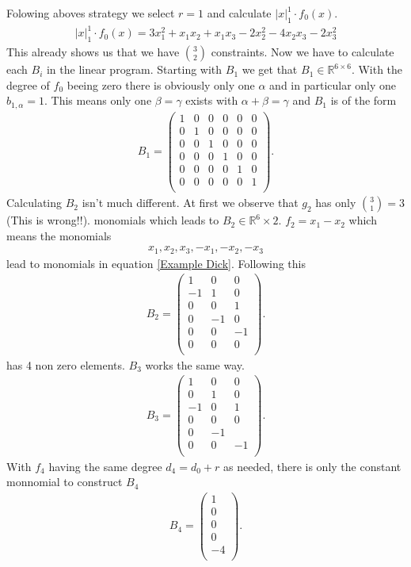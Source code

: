 \documentclass[./main.tex]{subfiles}
\begin{document}
Folowing aboves strategy we select $r=1$ and calculate $ \vert x \vert_1^1 \cdot f_0(x)$.
\begin{align}
\label{Example Dick}
 \vert x \vert_1^1 \cdot f_0(x) =  3x_1^2 +x_1x_2 +x_1x_3 -2x_2^2 - 4x_2x_3 - 2x_3^2
\end{align}
This already shows us that we have $\binom{3}{2}$ constraints. Now we have to calculate each $B_i$ in the linear program. Starting with $B_1$ we get that $B_1 \in \mathbb{R}^{6 \times 6}$. With the degree of $f_0$ beeing zero there is obviously only one $\alpha$ and in particular only one $b_{1,\alpha}= 1$. This means only one $\beta = \gamma$ exists with $\alpha + \beta = \gamma$ and $B_1$ is of the form
\begin{align*}
B_1 = \begin{pmatrix}
1&0&0&0&0&0\\
0&1&0&0&0&0\\
0&0&1&0&0&0\\
0&0&0&1&0&0\\
0&0&0&0&1&0\\
0&0&0&0&0&1\\
\end{pmatrix}.
\end{align*}
Calculating $B_2$ isn't much different. At first we observe that $g_2$ has only $\binom 3 1 = 3 $ (This is wrong!!). monomials which leads to $B_2 \in \mathbb{R}^6 \times 2$. $f_2 = x_1 -x_2$ which means the monomials
\begin{align*}
x_1,x_2,x_3,-x_1,-x_2,-x_3
\end{align*}
lead to monomials in equation \ref{Example Dick}. Following this 
\begin{align*}
B_2 = \begin{pmatrix}
1&0&0\\
-1&1&0\\
0&0&1\\
0&-1&0\\
0&0&-1\\
0&0&0\\
\end{pmatrix}.
\end{align*}
has 4 non zero elements. $B_3$ works the same way.
\begin{align*}
B_3 = \begin{pmatrix}
1&0&0\\
0&1&0\\
-1&0&1\\
0&0&0\\
0&-1&\\
0&0&-1\\
\end{pmatrix}.
\end{align*}
With $f_4$ having the same degree $d_4=d_0+r$ as needed, there is only the constant monnomial to construct $B_4$
\begin{align*}
B_4 = \begin{pmatrix}
1\\
0\\
0\\
0\\
-4\\
\end{pmatrix}.
\end{align*}
\end{document}
